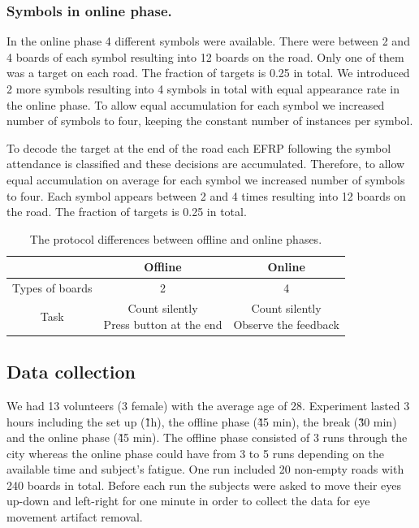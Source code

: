 \documentclass[12pt]{iopart}
\begin{document}
\subsubsection*{Symbols in online phase.}
In the online phase 4 different symbols were available. There were
between 2 and 4 boards of each symbol resulting into 12 boards on the road.
Only one of them was a target on each road. The fraction
of targets is 0.25 in total.
We introduced 2 more symbols resulting into 4 symbols in total
with equal appearance rate in the online phase.
To allow equal accumulation for each symbol we increased
number of symbols to four, keeping the constant number of instances per symbol. 

To decode the target at the end of the road each EFRP following the
symbol attendance
is classified and these decisions are accumulated.
Therefore, to allow equal accumulation on average for each symbol 
we increased number of symbols to four.
Each symbol appears between 2 and 4 times
resulting into 12 boards on the road.
The fraction of targets is 0.25 in total.



\begin{table}
    \centering
    \caption{The protocol differences between offline and online phases.}
    \begin{tabular}{c | c | c}
        \hline 
        & Offline & Online \\
        \hline 
        Types of boards & 2 & 4 \\
        Task & \shortstack{Count silently \\ Press button at the end} & \shortstack{Count silently \\ Observe the feedback} \\
        \hline 
    \end{tabular}
    \label{tab:OffOn}
\end{table}

\subsection{Data collection}
We had 13 volunteers (3 female) with the average age of 28.
Experiment lasted 3 hours including the set up (\~1h), the offline phase (\~45 min),
the break (\~30 min) and the online phase (\~45 min).
The offline phase consisted of 3 runs through the city  whereas the online
phase could have from 3 to 5 runs depending on the available time
and subject's fatigue.
One run included 20 non-empty roads with 240 boards in total.
Before each run the subjects were asked to move their eyes up-down and left-right
for one minute in order to collect the data for eye movement artifact removal.
\end{document}
